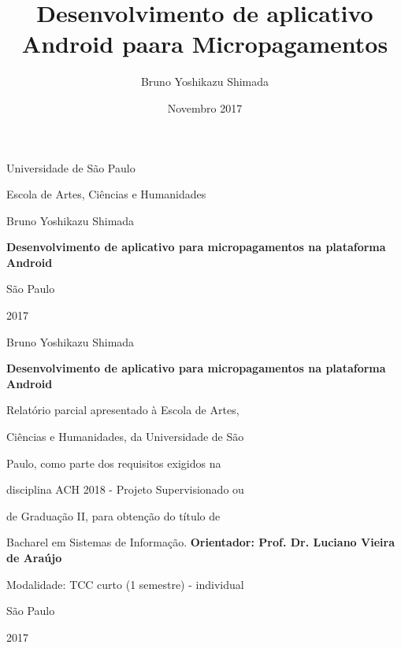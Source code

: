 \documentclass[hidelinks,12pt]{article}
\author{Bruno Yoshikazu Shimada}
\title{\textbf{Desenvolvimento de aplicativo Android paara Micropagamentos}
	}
\date{Novembro 2017}
\begin{document}
\begin{titlepage}
	\centering
	{\Large Universidade de S\~ao Paulo\par}
	{\Large Escola de Artes, Ci\^encias e Humanidades\par}
	\vfill
	{\Large Bruno Yoshikazu Shimada\par}
	\vspace{1cm}
	{\Large\bfseries Desenvolvimento de aplicativo para micropagamentos na plataforma Android\par}
	\vfill
	{\Large S\~ao Paulo\par}
	{\Large 2017\par}
\end{titlepage}
\newpage
\begin{titlepage}
	\centering
	{\Large Bruno Yoshikazu Shimada\par}
	\vspace{2cm}
	{\Large\bfseries Desenvolvimento de aplicativo para micropagamentos na plataforma Android\par}
	\vfill
	\begin{flushright}
		\hspace{7cm}Relat\'orio parcial apresentado \`a Escola de Artes,
	
		\hspace{7cm}Ci\^encias e Humanidades, da Universidade de S\~ao
	
		\hspace{7cm}Paulo, como parte dos requisitos exigidos na
	
		\hspace{7cm}disciplina ACH 2018 - Projeto Supervisionado ou
	
		\hspace{7cm}de Gradua\c{c}\~ao II, para obten\c{c}\~ao do t\'itulo de
	
		\hspace{7cm}Bacharel em Sistemas de Informa\c{c}\~ao.
		\bfseries Orientador: Prof. Dr. Luciano Vieira de Ara\'ujo
		
		Modalidade: TCC curto (1 semestre) - individual
	\end{flushright}
	\vspace{2cm}
	{\Large S\~ao Paulo\par}
	{\Large 2017\par}
\end{titlepage}
\newpage
\end{document}
